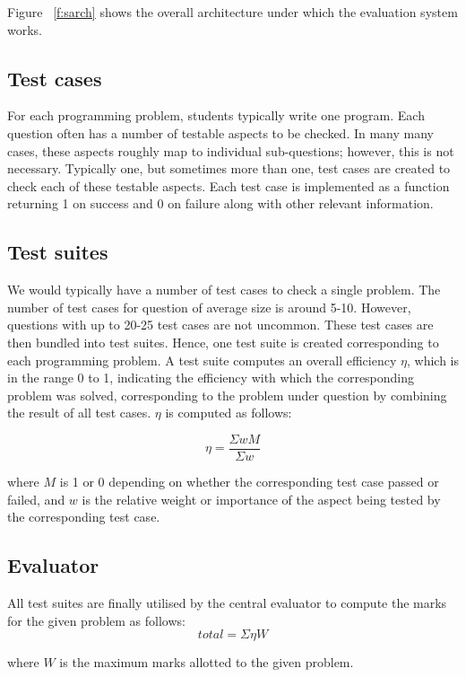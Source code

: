 \documentclass[12pt]{article}
\begin{document}
Figure ~\ref{f:sarch} shows the overall architecture under which the evaluation system works.

\subsection{Test cases}
For each programming problem, students typically write one program. Each question often has a number of testable aspects to be checked. In many many cases, these aspects roughly map to individual sub-questions; however, this is not necessary. Typically one, but sometimes more than one, test cases are created to check each of these testable aspects. Each test case is implemented as a function returning 1 on success and 0 on failure along with other relevant information.

\subsection{Test suites}
We would typically have a number of test cases to check a single problem. The number of test cases for question of average size is around 5-10. However, questions with up to 20-25 test cases are not uncommon. These test cases are then bundled into test suites. Hence, one test suite is created corresponding to each programming problem. A test suite computes an overall efficiency $\eta$, which is in the range 0 to 1, indicating the efficiency with which the corresponding problem was solved, corresponding to the problem under question by combining the result of all test cases. $\eta$ is computed as follows:

\begin{equation}
\eta = \frac{\Sigma wM}{\Sigma w}
\end{equation}

where $M$ is 1 or 0 depending on whether the corresponding test case passed or failed, and $w$ is the relative weight or importance of the aspect being tested by the corresponding test case.

\subsection{Evaluator}
All test suites are finally utilised by the central evaluator to compute the marks for the given problem as follows:
\begin{equation}
total = \Sigma \eta W
\end{equation}

where $W$ is the maximum marks allotted to the given problem.
\end{document}
